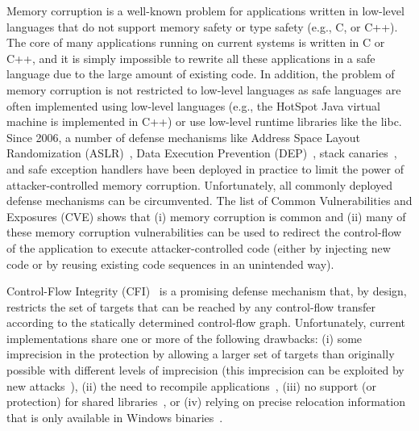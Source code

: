 \documentclass{acm_proc_article-sp}
\begin{document}
Memory corruption is a well-known problem for applications written in low-level
languages that do not support memory safety or type safety (e.g., C, or C++). The
core of many applications running on current systems is written in C or C++, and
it is simply impossible to rewrite all these applications in a safe language due
to the large amount of existing code. In addition, the problem of memory
corruption is not restricted to low-level languages as safe languages are often
implemented using low-level languages (e.g., the HotSpot Java virtual machine is
implemented in C++) or use low-level runtime libraries like the libc. Since
2006, a number of defense mechanisms like Address Space Layout Randomization
(ASLR)~\cite{aslr}, Data Execution Prevention (DEP)~\cite{execshield}, stack
canaries~\cite{propolice01hiroaki}, and safe exception handlers have been
deployed in practice to limit the power of attacker-controlled memory
corruption. Unfortunately, all commonly deployed defense mechanisms can be
circumvented. The list of Common Vulnerabilities and Exposures (CVE) shows that
(i) memory corruption is common and (ii) many of these memory corruption
vulnerabilities can be used to redirect the control-flow of the application to
execute attacker-controlled code (either by injecting new code or by reusing
existing code sequences in an unintended way). 


Control-Flow Integrity (CFI)~\cite{ccs05erlingsson, osdi06erlingsson,
philippaerts11dimva, bletsch11acsac, wang10oakland, zeng13usenix,
zhang13oakland, zhang13asiaccs, zhang13security, criswell14sp, niu14pldi} is a
promising defense mechanism that, by design, restricts the set of targets that
can be reached by any control-flow transfer according to the statically
determined control-flow graph. Unfortunately, current implementations share one
or more of the following drawbacks: (i) some imprecision in the protection by
allowing a larger set of targets than originally possible with different levels
of imprecision (this imprecision can be exploited by new
attacks~\cite{bittau14sp, bosman14sp, goektas14sp}), (ii) the need to recompile
applications~\cite{ccs05erlingsson, osdi06erlingsson, philippaerts11dimva,
bletsch11acsac, wang10oakland, zeng13usenix}, (iii) no support (or protection)
for shared libraries~\cite{ccs05erlingsson, osdi06erlingsson,
philippaerts11dimva, bletsch11acsac, wang10oakland}, or (iv) relying on precise
relocation information that is only available in Windows
binaries~\cite{zhang13oakland, zhang13asiaccs}.
\end{document}
